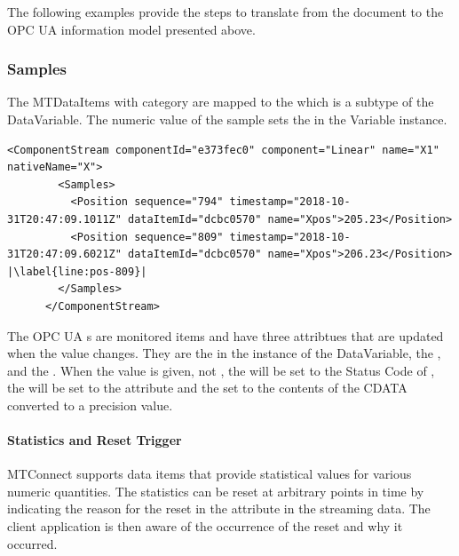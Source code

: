 The following examples provide the steps to translate from the  document to the OPC UA information model presented above.

\subsubsection{Samples}

The \glspl{MTDataItem} with \gls{category}  are mapped to the  which is a subtype of the  \gls{DataVariable}. The numeric value of the sample sets the  in the  \gls{Variable} instance.

\begin{lstlisting}[firstnumber=last,escapechar=|,%
    caption={Linear Component Stream},label={lst:linear-component-stream}]
      <ComponentStream componentId="e373fec0" component="Linear" name="X1" nativeName="X"> 
        <Samples>
          <Position sequence="794" timestamp="2018-10-31T20:47:09.1011Z" dataItemId="dcbc0570" name="Xpos">205.23</Position>
          <Position sequence="809" timestamp="2018-10-31T20:47:09.6021Z" dataItemId="dcbc0570" name="Xpos">206.23</Position> |\label{line:pos-809}|
        </Samples>
      </ComponentStream>
\end{lstlisting}

The OPC UA s are monitored items and have three attribtues that are updated when the value changes. They are the  in the instance of the \gls{DataVariable}, the , and the . When the value is given, not , the  will be set to the Status Code of , the  will be set to the  attribute and the  set to the contents of the \gls{CDATA} converted to a  precision value.

\paragraph{Statistics and Reset Trigger}

MTConnect supports data items that provide statistical values for various numeric quantities. The statistics can be reset at arbitrary points in time by indicating the reason for the reset in the attribute  in the streaming data. The client application is then aware of the occurrence of the reset and why it occurred.

